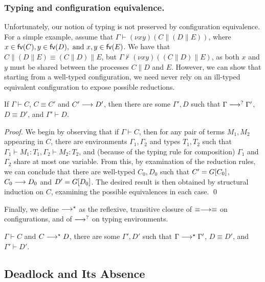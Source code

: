 \documentclass[orivec,envcountsame]{llncs}
\begin{document}
\subsubsection{Typing and configuration equivalence.}

Unfortunately, our notion of typing is not preserved by configuration equivalence.  For a simple
example, assume that $\Gamma \vdash (\nu x y)(C \parallel (D \parallel E))$, where $x \in \mathsf{fv}(C), y
\in \mathsf{fv}(D), \text{ and } x,y \in \mathsf{fv}(E)$.  We have that $C \parallel (D \parallel E) \equiv
(C \parallel D) \parallel E$, but $\Gamma \nvdash (\nu x y)((C \parallel D) \parallel E)$, as both
$x$ and $y$ must be shared between the processes $C \parallel D$ and $E$.  However, we can show that
starting from a well-typed configuration, we need never rely on an ill-typed equivalent
configuration to expose possible reductions.
%
\begin{theorem}\label{thm:preservation-equiv}
  If $\Gamma \vdash C$, $C \equiv C'$ and $C' \longrightarrow D'$, then there are some $\Gamma',D$ such that
  $\Gamma \longrightarrow^? \Gamma'$, $D \equiv D'$, and $\Gamma' \vdash D$.
\end{theorem}
%
\begin{proof}
  We begin by observing that if $\Gamma \vdash C$, then for any pair of terms $M_1, M_2$ appearing
  in $C$, there are environments $\Gamma_1,\Gamma_2$ and types $T_1,T_2$ such that $\Gamma_1 \vdash
  M_1 : T_1,\Gamma_2 \vdash M_2 : T_2$, and (because of the typing rule for composition) $\Gamma_1$
  and $\Gamma_2$ share at most one variable.  From this, by examination of the reduction rules, we
  can conclude that there are well-typed $C_0,D_0$ such that $C' = G[C_0]$, $C_0 \longrightarrow D_0$ and
  $D' = G[D_0]$.  The desired result is then obtained by structural induction on $C$, examining
  the possible equivalences in each case. \qed
\end{proof}
%
Finally, we define $\longrightarrow^\star$ as the reflexive, transitive closure of $\equiv\longrightarrow\equiv$ on
configurations, and of $\longrightarrow^?$ on typing environments.
%
\begin{corollary}
  $\Gamma \vdash C$ and $C \longrightarrow^\star D$, there are some $\Gamma',D'$ such that $\Gamma
  \longrightarrow^\star \Gamma'$, $D \equiv D'$, and $\Gamma' \vdash D'$.
\end{corollary}

\subsection{Deadlock and Its Absence}\label{sec:gv-deadlock}
\newcommand{\blockedp}{\mathsf{blocked}}
\newcommand{\depp}{\mathsf{depends}}
\newcommand{\deadlockp}{\ensuremath{\mathsf{deadlocked}}}
\end{document}
